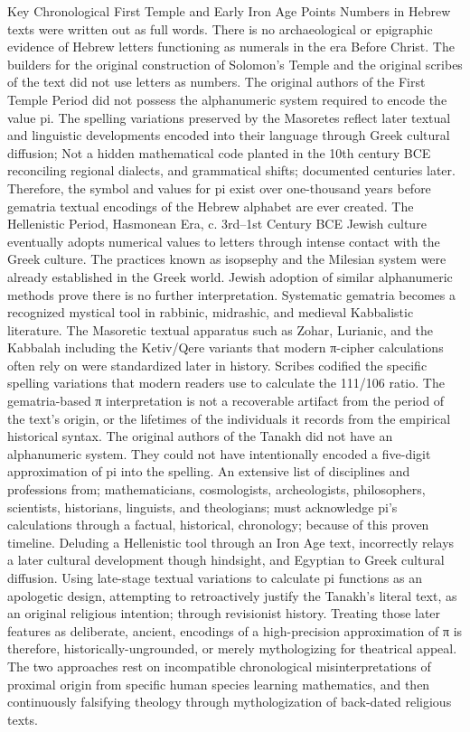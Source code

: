 Key Chronological First Temple and Early Iron Age Points
Numbers in Hebrew texts were written out as full words. There is no archaeological or epigraphic evidence of Hebrew letters functioning as numerals in the era Before Christ. The builders for the original construction of Solomon’s Temple and the original scribes of the text did not use letters as numbers. The original authors of the First Temple Period did not possess the alphanumeric system required to encode the value pi. The spelling variations preserved by the Masoretes reflect later textual and linguistic developments encoded into their language through Greek cultural diffusion; Not a hidden mathematical code planted in the 10th century BCE reconciling regional dialects, and grammatical shifts; documented centuries later. Therefore, the symbol and values for pi exist over one-thousand years before gematria textual encodings of the Hebrew alphabet are ever created.
The Hellenistic Period, Hasmonean Era, c. 3rd–1st Century BCE
Jewish culture eventually adopts numerical values to letters through intense contact with the Greek culture. The practices known as isopsephy and the Milesian system were  already established in the Greek world. Jewish adoption of similar alphanumeric methods prove there is no further interpretation. Systematic gematria becomes a recognized mystical tool in rabbinic, midrashic, and medieval Kabbalistic literature. The Masoretic textual apparatus such as Zohar, Lurianic, and the Kabbalah including the Ketiv/Qere variants that modern π-cipher calculations often rely on were standardized later in history. Scribes codified the specific spelling variations that modern readers use to calculate the 111/106 ratio. 
The gematria-based π interpretation is not a recoverable artifact from the period of the text’s origin, or the lifetimes of the individuals it records from the empirical historical syntax. The original authors of the Tanakh did not have an alphanumeric system. They could not have intentionally encoded a five-digit approximation of pi into the spelling. An extensive list of disciplines and professions from; mathematicians, cosmologists, archeologists, philosophers, scientists, historians, linguists, and theologians; must acknowledge pi’s calculations through a factual, historical, chronology; because of this proven timeline. Deluding a Hellenistic tool through an Iron Age text, incorrectly relays a later cultural development though hindsight, and Egyptian to Greek cultural diffusion. Using late-stage textual variations to calculate pi functions as an apologetic design, attempting to retroactively justify the Tanakh’s literal text, as an original religious intention; through revisionist history. Treating those later features as deliberate, ancient, encodings of a high-precision approximation of π is therefore, historically-ungrounded, or merely mythologizing for theatrical appeal. The two approaches rest on incompatible chronological misinterpretations of proximal origin from specific human species learning mathematics, and then continuously falsifying theology through mythologization of back-dated religious texts. 
